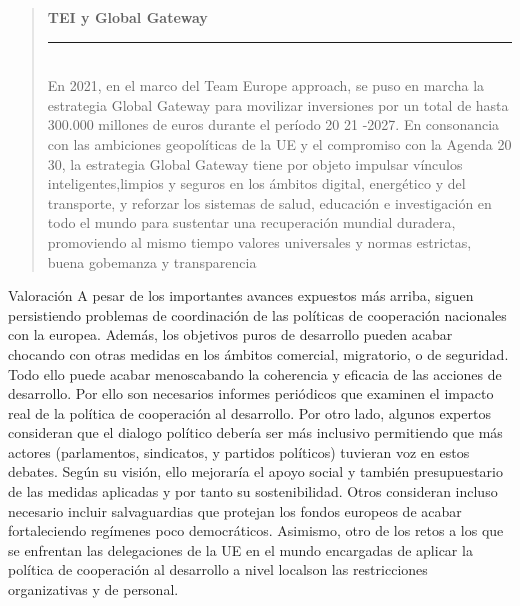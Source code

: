 \documentclass[10pt,a4paper]{article}
\newenvironment{specialblock}[1]{%
      \begin{quote} %
      \small %
      \noindent\textbf{#1}\\[-0.3em] %
      \rule{\linewidth}{0.4pt}\\[0.6em]}{
      \end{quote}}
\begin{document}
\begin{specialblock}{TEI y Global Gateway}
    En 2021, en el marco del Team Europe approach, se puso en marcha la estrategia Global Gateway para movilizar inversiones por un total de hasta 300.000 millones de euros durante el período 20 21 -2027. En consonancia con las ambiciones geopolíticas de la UE y el compromiso con la Agenda 20 30, la estrategia Global Gateway tiene por objeto impulsar vínculos inteligentes,limpios y seguros en los ámbitos digital, energético y del transporte, y reforzar los sistemas de salud, educación e investigación en todo el mundo para sustentar una recuperación mundial duradera, promoviendo al mismo tiempo valores universales y normas estrictas, buena gobemanza y transparencia
\end{specialblock}


Valoración
A pesar de los importantes avances expuestos más arriba, siguen persistiendo problemas de coordinación de las políticas de cooperación nacionales con la europea. Además, los objetivos puros de desarrollo pueden acabar chocando con otras medidas en los ámbitos comercial, migratorio, o de seguridad. Todo ello puede acabar menoscabando la coherencia y eficacia de las acciones de desarrollo. Por ello son necesarios informes periódicos que examinen el impacto real de la política de cooperación al desarrollo. Por otro lado, algunos expertos consideran que el dialogo político debería ser más inclusivo permitiendo que más actores (parlamentos, sindicatos, y partidos políticos) tuvieran voz en estos debates. Según su visión, ello mejoraría el apoyo social y también presupuestario de las medidas aplicadas y por tanto su sostenibilidad. Otros consideran incluso necesario incluir salvaguardias que protejan los fondos europeos de acabar fortaleciendo regímenes poco democráticos. Asimismo, otro de los retos a los que se enfrentan las delegaciones de la UE en el mundo encargadas de aplicar la política de cooperación al desarrollo a nivel localson las restricciones organizativas y de personal.
\end{document}
